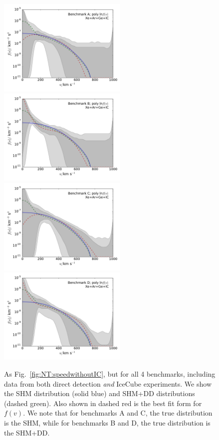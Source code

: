 \begin{figure}[!pht]
  \centering
  \includegraphics[trim=0.5cm 0.5cm 0.5cm 0.5cm, clip,width=0.55\textwidth]{NT/BenchmarkA_poly-speed.pdf}
  \includegraphics[trim=0.5cm 0.5cm 0.5cm 0.5cm, clip,width=0.55\textwidth]{NT/BenchmarkB_poly-speed.pdf}
  \includegraphics[trim=0.5cm 0.5cm 0.5cm 0.5cm, clip,width=0.55\textwidth]{NT/BenchmarkC_poly-speed.pdf}
  \includegraphics[trim=0.5cm 0.5cm 0.5cm 0.5cm, clip,width=0.55\textwidth]{NT/BenchmarkD_poly-speed.pdf}
\caption[As Fig.~\ref{fig:NT:speedwithoutIC}, but using IceCube data for all 4 benchmarks]{As Fig.~\ref{fig:NT:speedwithoutIC}, but for all 4 benchmarks, including data from both direct detection \textit{and} IceCube experiments. We show the SHM distribution (solid blue) and SHM+DD distributions (dashed green). Also shown in dashed red is the best fit form for $f(v)$. We note that for benchmarks A and C, the true distribution is the SHM, while for benchmarks B and D, the true distribution is the SHM+DD.}
\label{fig:NT:speedwithIC}
\end{figure}

